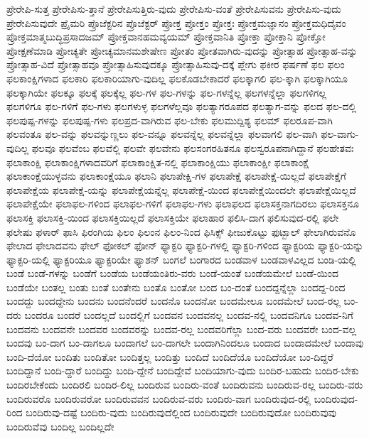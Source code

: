 {ಪ್ರೇರೇಪಿ-ಸುತ್ತ
ಪ್ರೇರೇಪಿಸು-ತ್ತಾನೆ
ಪ್ರೇರೇಪಿಸುತ್ತಿರು-ವುದು
ಪ್ರೇರೇಪಿಸು-ವಂತೆ
ಪ್ರೇರೇಪಿಸುವನು
ಪ್ರೇರೇಪಿಸು-ವುದು
ಪ್ರೇರೇಪಿಸುವುದೇ
ಪ್ರೈಮರಿ
ಪ್ರೊಜೆಕ್ಟರಿನ
ಪ್ರೊಜೆಕ್ಟರ್
ಪ್ರೋಕ್ತ
ಪ್ರೋಕ್ತಂ
ಪ್ರೋಕ್ತಃ
ಪ್ರೋಕ್ತಮಜ್ಞಾನಂ
ಪ್ರೋಕ್ತಮಧಿದೈವಂ
ಪ್ರೋಕ್ತಮಾತ್ಮಬುದ್ಧಿಪ್ರಸಾದಜಮ್
ಪ್ರೋಕ್ತವಾನಹಮವ್ಯಯಮ್
ಪ್ರೋಕ್ತವಾನಿತಿ
ಪ್ರೋಕ್ತಾ
ಪ್ರೋಕ್ತಾನಿ
ಪ್ರೋಕ್ತೋ
ಪ್ರೋಕ್ಷಣೆಮಾಡಿ
ಪ್ರೋಚ್ಯತೇ
ಪ್ರೋಚ್ಯಮಾನಮಶೇಷೇಣ
ಪ್ರೋತಂ
ಪ್ರೋತವಾಗಿರು-ವುದನ್ನು
ಪ್ರೋತ್ಸಾಹ
ಪ್ರೋತ್ಸಾಹ-ವನ್ನು
ಪ್ರೋತ್ಸಾಹ-ವಿದೆ
ಪ್ರೋತ್ಸಾಹವೂ
ಪ್ರೋತ್ಸಾಹಿಸುವುದಕ್ಕೂ
ಪ್ರೋತ್ಸಾಹಿಸುವು-ದಕ್ಕೆ
ಪ್ಲೇಗು
ಫಕೀರ
ಫರ್ಷಣೆ
ಫಲ
ಫಲಂ
ಫಲಕಾಂಕ್ಷಿಗಳಾದ
ಫಲಕಾರಿ
ಫಲಕಾರಿಯಾಗು-ವುದಿಲ್ಲ
ಫಲಕೊಡಬೇಕಾದರೆ
ಫಲಕ್ಕಾಗಲಿ
ಫಲ-ಕ್ಕಾಗಿ
ಫಲಕ್ಕಾಗಿಯೂ
ಫಲಕ್ಕಾಗಿಯೇ
ಫಲಕ್ಕೂ
ಫಲಕ್ಕೆ
ಫಲಕ್ಕೆಲ್ಲ
ಫಲ-ಗಳ
ಫಲ-ಗಳನ್ನು
ಫಲ-ಗಳನ್ನೆಲ್ಲ
ಫಲಗಳನ್ನೆಲ್ಲಾ
ಫಲಗಳಿಗಲ್ಲ
ಫಲಗಳಿಗೂ
ಫಲ-ಗಳಿಗೆ
ಫಲ-ಗಳು
ಫಲಗಳುಳ್ಳ
ಫಲಗಳೆಲ್ಲವೂ
ಫಲತ್ಯಾಗರೂಪದ
ಫಲತ್ಯಾಗ-ವನ್ನು
ಫಲದ
ಫಲ-ದಲ್ಲಿ
ಫಲಪುಷ್ಪ-ಗಳನ್ನು
ಫಲಪುಷ್ಪ-ಗಳು
ಫಲಪ್ರದ-ವಾಗಿರುವ
ಫಲ-ಬೇಕು
ಫಲಮುದ್ದಿಶ್ಯ
ಫಲಮ್
ಫಲರೂಪ-ವಾಗಿ
ಫಲವಂತೂ
ಫಲ-ವನ್ನು
ಫಲವನ್ನುಣ್ಣಲು
ಫಲ-ವನ್ನೂ
ಫಲವನ್ನೆಲ್ಲ
ಫಲವನ್ನೆಲ್ಲಾ
ಫಲವಾಗಲಿ
ಫಲ-ವಾಗಿ
ಫಲ-ವಾಗು-ವುದಿಲ್ಲ
ಫಲವೂ
ಫಲವೆಂಬ
ಫಲವೆಲ್ಲಿ
ಫಲವೇ
ಫಲವೇನು
ಫಲಸಂಗರಹಿತನೂ
ಫಲಸ್ವರೂಪನಾಗಿದ್ದಾನೆ
ಫಲಹೇತವಃ
ಫಲಾಕಾಂಕ್ಷಿ
ಫಲಾಕಾಂಕ್ಷಿಗಳಾದವರಿಗೆ
ಫಲಾಕಾಂಕ್ಷಿತ-ನಲ್ಲಿ
ಫಲಾಕಾಂಕ್ಷಿಯು
ಫಲಾಕಾಂಕ್ಷೀ
ಫಲಾಕಾಂಕ್ಷೆ
ಫಲಾಕಾಂಕ್ಷೆಯುಳ್ಳವನು
ಫಲಾಕಾಂಕ್ಷೆಯೂ
ಫಲಾನಿ
ಫಲಾಪೇಕ್ಷಿ-ಗಳ
ಫಲಾಪೇಕ್ಷೆ
ಫಲಾಪೇಕ್ಷೆ-ಯಿಲ್ಲದೆ
ಫಲಾಪೇಕ್ಷೆಗೆ
ಫಲಾಪೇಕ್ಷೆಯ
ಫಲಾಪೇಕ್ಷೆ-ಯನ್ನು
ಫಲಾಪೇಕ್ಷೆಯನ್ನೆಲ್ಲ
ಫಲಾಪೇಕ್ಷೆ-ಯಿಂದ
ಫಲಾಪೇಕ್ಷೆಯಿಂದಲೇ
ಫಲಾಪೇಕ್ಷೆಯಿಲ್ಲದೆ
ಫಲಾಪೇಕ್ಷೆಯೇ
ಫಲಾಫಲ-ಗಳಿಂದ
ಫಲಾಫಲ-ಗಳಿಗೆ
ಫಲಾಫಲ-ಗಳು
ಫಲಾಫಲದ
ಫಲಾಸಕ್ತನಾಗದಿರಲು
ಫಲಾಸಕ್ತನೂ
ಫಲಾಸಕ್ತಿ
ಫಲಾಸಕ್ತಿ-ಯಿಂದ
ಫಲಾಸಕ್ತಿಯಿಲ್ಲದೆ
ಫಲಾಸಕ್ತಿಯೇ
ಫಲಾಹಾರ
ಫಲಿಸಿ-ದಾಗ
ಫಲಿಸುವುದ-ರಲ್ಲಿ
ಫಲೇ
ಫಲೇಷು
ಫಳಾರ್
ಫಾಸಿ
ಫಿರಂಗಿಯ
ಫಿಲಂ
ಫಿಲಂನ
ಫಿಲಂ-ನಿಂದ
ಫಿಸಿಕ್ಸ್
ಫೀಜುಕೊಟ್ಟು
ಫುಟ್ಬಾಲ್
ಫೇಲಾಗಿರುವನೊ
ಫೇಲಾದ
ಫೇಲಾದವನು
ಫೇಲ್
ಫೋಕಲ್
ಫೋನ್
ಫ್ಯಾಕ್ಟರಿ
ಫ್ಯಾಕ್ಟರಿ-ಗಳಲ್ಲಿ
ಫ್ಯಾಕ್ಟರಿ-ಗಳಿಂದ
ಫ್ಯಾಕ್ಟರಿಯ
ಫ್ಯಾಕ್ಟರಿ-ಯನ್ನು
ಫ್ಯಾಕ್ಟರಿ-ಯಲ್ಲಿ
ಫ್ಯಾಕ್ಟರಿಯೂ
ಫ್ಯಾಕ್ಟರಿಯೇ
ಫ್ಯಾಶನ್
ಬಂಗಲೆ
ಬಂಗಾರದ
ಬಂಡವಾಳ
ಬಂಡವಾಳವಿಲ್ಲದ
ಬಂಡಿ-ಯಲ್ಲಿ
ಬಂಡೆ
ಬಂಡೆ-ಗಳನ್ನು
ಬಂಡೆಗೆ
ಬಂಡೆಯ
ಬಂಡೆಯಂತಿರು-ವರು
ಬಂಡೆ-ಯಂತೆ
ಬಂಡೆಯಮೇಲೆ
ಬಂಡೆ-ಯಿಂದ
ಬಂಡೆಯೇ
ಬಂತಲ್ಲ
ಬಂತು
ಬಂತೆ
ಬಂತೇನು
ಬಂತೊ
ಬಂತೋ
ಬಂದ
ಬಂ-ದಂತೆ
ಬಂದದ್ದನ್ನೆಲ್ಲಾ
ಬಂದದ್ದ-ರಿಂದ
ಬಂದದ್ದು
ಬಂದದ್ದೇನು
ಬಂದನು
ಬಂದನೆಂದರೆ
ಬಂದನೊ
ಬಂದನೋ
ಬಂದಮೇಲೂ
ಬಂದಮೇಲೆ
ಬಂದ-ರಲ್ಲ
ಬಂ-ದರು
ಬಂದರೂ
ಬಂದರೆ
ಬಂದಲ್ಲದೆ
ಬಂದಲ್ಲಿಗೆ
ಬಂದವನ
ಬಂದವನಲ್ಲ
ಬಂದವ-ನಲ್ಲಿ
ಬಂದವನಿಗೂ
ಬಂದವ-ನಿಗೆ
ಬಂದವನು
ಬಂದವನೇ
ಬಂದವರ
ಬಂದವರನ್ನು
ಬಂದವ-ರಲ್ಲ
ಬಂದವರಿಗೆಲ್ಲಾ
ಬಂದ-ವರು
ಬಂದವರೇ
ಬಂದ-ವಲ್ಲ
ಬಂದವು
ಬಂ-ದಾಗ
ಬಂ-ದಾಗಲೂ
ಬಂದಾಗಲೆ
ಬಂ-ದಾಗಲೇ
ಬಂದಾಗಿನಿಂದಲೂ
ಬಂದಾದ
ಬಂದಾದಮೇಲೆ
ಬಂದಾವು
ಬಂದಿ-ದೆಯೋ
ಬಂದಿತು
ಬಂದಿತೋ
ಬಂದಿತ್ತಲ್ಲ
ಬಂದಿತ್ತು
ಬಂದಿದೆ
ಬಂದಿದೆಯೊ
ಬಂದಿದೆಯೋ
ಬಂ-ದಿದ್ದರೆ
ಬಂದಿದ್ದಾನೆ
ಬಂದಿ-ದ್ದಾರೆ
ಬಂದಿದ್ದು
ಬಂದಿ-ದ್ದೇನೆ
ಬಂದಿದ್ದೇವೆ
ಬಂದಿಯಾಗು-ವುದು
ಬಂದಿರ-ಬಹುದು
ಬಂದಿರ-ಬೇಕು
ಬಂದಿರಬೇಕೆಂದು
ಬಂದಿರಲಿ
ಬಂದಿರ-ಲಿಲ್ಲ
ಬಂದಿರುವ
ಬಂದಿರು-ವಂತೆ
ಬಂದಿರುವನು
ಬಂದಿರುವ-ರಲ್ಲ
ಬಂದಿರು-ವರು
ಬಂದಿರುವರೊ
ಬಂದಿರುವರೋ
ಬಂದಿರುವವನ
ಬಂದಿರುವ-ವರು
ಬಂದಿರು-ವಾಗ
ಬಂದಿರುವುದ-ರಲ್ಲಿ
ಬಂದಿರುವುದ-ರಿಂದ
ಬಂದಿರುವು-ದಷ್ಟೆ
ಬಂದಿರು-ವುದು
ಬಂದಿರುವುದೆಲ್ಲಿಂದ
ಬಂದಿರುವುದೇ
ಬಂದಿರುವುದೋ
ಬಂದಿರುವುವು
ಬಂದಿರುವೆವು
ಬಂದಿಲ್ಲ
ಬಂದಿಲ್ಲದೇ
}
